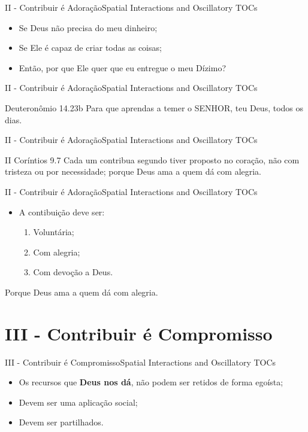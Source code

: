 \documentclass[14pt,aspectratio=169]{beamer}
\newcommand{\TT}{Spatial Interactions and Oscillatory TOCs}
\newcommand{\PII}{II - Contribuir é Adoração}
\newcommand{\PIII}{III - Contribuir é Compromisso}
\begin{document}
\begin{frame}{\PII}{\TT}
 \begin{itemize}
  \item Se Deus não precisa do meu dinheiro;\pause
  \item Se Ele é capaz de criar todas as coisas;\pause
  \item Então, por que Ele quer que eu entregue o meu Dízimo?
 \end{itemize}
\end{frame}

\begin{frame}{\PII}{\TT}
 \begin{block}{Deuteronômio 14.23b}
Para que aprendas a temer o SENHOR, teu Deus, todos os dias.
 \end{block}
\end{frame}

\begin{frame}{\PII}{\TT}
 \begin{block}{II Coríntios 9.7}
Cada um contribua segundo tiver proposto no coração, não com tristeza ou por necessidade; porque Deus ama a quem dá com alegria.
  \end{block}
\end{frame}

\begin{frame}{\PII}{\TT}
 \begin{itemize}
  \item A contibuição deve ser:\pause
   \begin{enumerate}
   \Large
    \item Voluntária;\pause
    \item Com alegria;\pause
    \item Com devoção a Deus.
   \end{enumerate}    
 \end{itemize}
 \begin{center}
Porque Deus ama a quem dá com alegria.
 \end{center}
\end{frame}

\section{\PIII}
\begin{frame}{\PIII}{\TT}\pause
 \begin{itemize}
  \item Os recursos que \textbf{Deus nos dá}, não podem ser retidos de forma egoísta;\pause
  \item Devem ser uma aplicação social;\pause
  \item Devem ser partilhados.
 \end{itemize}
\end{frame}
\end{document}
